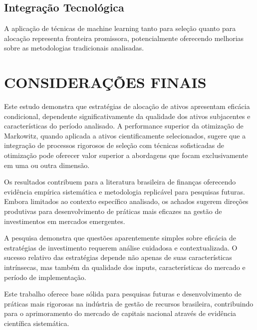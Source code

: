 \subsection{Integração Tecnológica}

A aplicação de técnicas de machine learning tanto para seleção quanto para alocação representa fronteira promissora, potencialmente oferecendo melhorias sobre as metodologias tradicionais analisadas.

\section{CONSIDERAÇÕES FINAIS}

Este estudo demonstra que estratégias de alocação de ativos apresentam eficácia condicional, dependente significativamente da qualidade dos ativos subjacentes e características do período analisado. A performance superior da otimização de Markowitz, quando aplicada a ativos cientificamente selecionados, sugere que a integração de processos rigorosos de seleção com técnicas sofisticadas de otimização pode oferecer valor superior a abordagens que focam exclusivamente em uma ou outra dimensão.

Os resultados contribuem para a literatura brasileira de finanças oferecendo evidência empírica sistemática e metodologia replicável para pesquisas futuras. Embora limitados ao contexto específico analisado, os achados sugerem direções produtivas para desenvolvimento de práticas mais eficazes na gestão de investimentos em mercados emergentes.

A pesquisa demonstra que questões aparentemente simples sobre eficácia de estratégias de investimento requerem análise cuidadosa e contextualizada. O sucesso relativo das estratégias depende não apenas de suas características intrínsecas, mas também da qualidade dos inputs, características do mercado e período de implementação.

Este trabalho oferece base sólida para pesquisas futuras e desenvolvimento de práticas mais rigorosas na indústria de gestão de recursos brasileira, contribuindo para o aprimoramento do mercado de capitais nacional através de evidência científica sistemática.